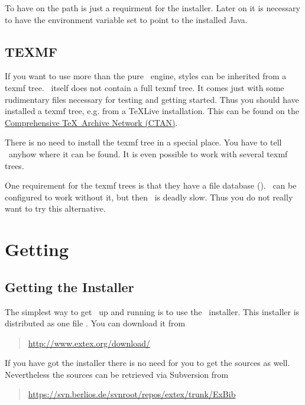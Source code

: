 To have  on the path is just a requirment for the
installer. Later on it is necessary to have the environment
variable  set to point to
the installed Java. 


\subsection{TEXMF}%

If you want to use more than the pure \ExBib\ engine, styles can be
inherited from a texmf tree. \ExBib\ itself does not
contain a full texmf tree. It comes just with some rudimentary files
necessary for testing and getting started. Thus you should have
installed a texmf tree, e.g. from a \TeX Live
installation. This can be found on the
\href{http://www.ctan.org}{Comprehensive \TeX\ Archive Network
  (CTAN)}.

There is no need to install the texmf tree in a special place. You
have to tell \ExBib\ anyhow where it can be found. It is even possible
to work with several texmf trees.

One requirement for the texmf trees is that they have a file database
(). \ExBib\ can be configured to work without it, but then
\ExBib\ is deadly slow. Thus you do not really want to try this
alternative.

\section{Getting \ExBib}

\subsection{Getting the Installer}

The simplest way to get \ExBib\ up and running is to use the \ExBib\ 
installer. This installer is distributed as one file
\File{ExBib-setup.jar}. You can download it from

\begin{quotation}
  \url{http://www.extex.org/download/}
\end{quotation}

If you have got the installer there is no need for you to get the
sources as well. Nevertheless the sources can be retrieved via
Subversion from
\begin{quotation}
  \url{https://svn.berlios.de/svnroot/repos/extex/trunk/ExBib}
\end{quotation}


